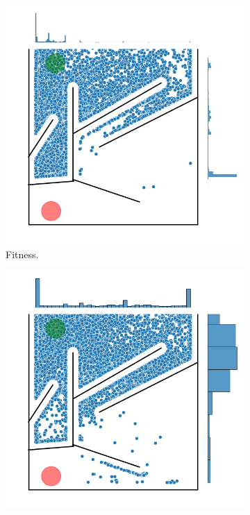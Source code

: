 \begin{figure}[H]
    \begin{mdframed}
        \begin{subfigure}[b]{0.45\textwidth}
            \includegraphics[scale=0.4]{resources/mazes/pure_fitness_open_all_runs.png}
            \caption{Fitness.}
        \end{subfigure}
        \begin{subfigure}[b]{0.5\textwidth}
            \includegraphics[scale=0.4]{resources/mazes/pure_novelty_open_all_runs.png}

\end{subfigure}
\end{mdframed}
\end{figure}
